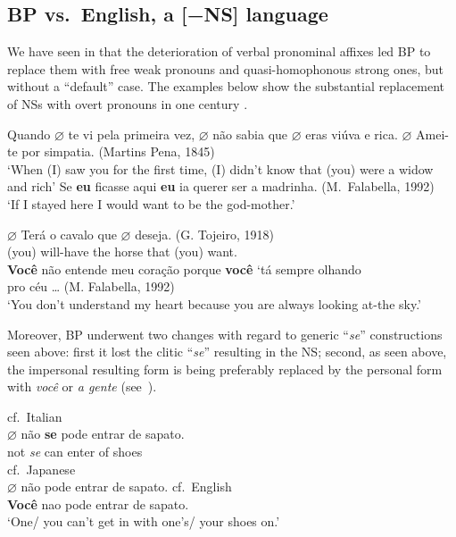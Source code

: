 \documentclass[output=paper]{langsci/langscibook}
\begin{document}
\subsection{BP vs.\ English, a [−NS] language}\label{sec:key:26.3.4}

We have seen in  that the deterioration of verbal pronominal
affixes led \gls{BP} to replace them with free weak
pronouns and quasi-homophonous strong ones, but without a “default”
case. The examples below show the substantial replacement of NSs with overt
pronouns in one century \parencite{Duarte1993,Duarte2012}.

\ea%
    \label{ex:key:26.42}
    \ea     Quando \textbf{$\varnothing$\tss{\Fsg}} te vi pela
    primeira vez, \textbf{$\varnothing$\tss{\Fsg}} não sabia que
    \textbf{$\varnothing$\tss{\Ssg}} eras viúva e rica.
    \textbf{$\varnothing$\tss{\Fsg}} Amei-te por simpatia.  (Martins
    Pena, 1845)\\ ‘When (I) saw you for the first time, (I) didn’t know that
    (you) were a widow and rich’
    \ex     Se \textbf{eu} ficasse aqui \textbf{eu} ia querer ser a madrinha.
    (M.\ Falabella, 1992)\\ ‘If  I   stayed here  I would want to be the
    god-mother.’
    \z
\z

\ea%
    \label{ex:key:26.43}
    \ea
	\gll	\textbf{$\varnothing$\tss{\Ssg}} Terá o cavalo que \textbf{$\varnothing$\tss{\Ssg}} deseja. (G. Tojeiro, 1918)\\
			(you) will-have the horse that (you) want.\\
	\ex	    \textbf{Você} não entende meu coração porque \textbf{você} ‘tá sempre olhando\\
			pro céu \dots{} (M. Falabella, 1992) \\
	        \enquote*{You  don't understand my heart because  you are always looking at-the sky.}
    \z
\z

Moreover, \gls{BP} underwent two changes with regard
to generic “\emph{se}” constructions seen above:  first it lost the clitic
“\emph{se}” resulting in the NS; second, as seen above, the impersonal
resulting form is being preferably replaced by the personal form with \emph{você} or
\emph{a gente} (see~).

\ea%
    \label{ex:key:26.44}
    \ea cf.\ Italian\\
    \gll    $\varnothing$\tss{\Genc} não \textbf{se} pode entrar de sapato.\\
            {} not   \emph{se}  can   enter  of shoes\\
    \ex cf.\ Japanese\\
        $\varnothing$\tss{\Genc} não pode entrar de sapato.
    \ex cf.\ English\\
        \textbf{Você} nao pode entrar de sapato.\\
        ‘One/ you can’t get in with one’s/ your shoes on.’
    \z
\z
\end{document}
